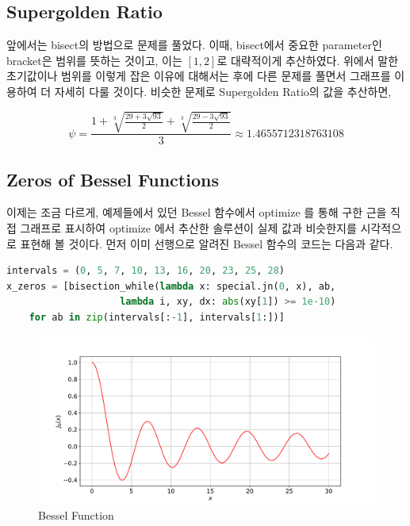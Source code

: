 \documentclass[11pt]{article}
\begin{document}
\vspace{5mm}

\vspace{5mm}

\subsection{Supergolden Ratio} 
\noindent
앞에서는 bisect의 방법으로 문제를 풀었다. 이때, bisect에서 중요한 parameter인 bracket은 범위를 뜻하는 것이고, 이는 $[1, 2]$로 대략적이게 추산하였다. 위에서 말한 초기값이나 범위를 이렇게 잡은 이유에 대해서는 후에 다른 문제를 풀면서 그래프를 이용하여 더 자세히 다룰 것이다. 비슷한 문제로 Supergolden Ratio의 값을 추산하면, 

\vspace{5mm}

\vspace{5mm}

$$
\psi = \frac{1 + \sqrt[3]{\frac{29 + 3\sqrt{93}}{2}} + \sqrt[3]{\frac{29 - 3\sqrt{93}}{2}}}{3}
\approx 1.4655712318763108
$$

\subsection{Zeros of Bessel Functions} 
\noindent
이제는 조금 다르게, 예제들에서 있던 Bessel 함수에서 optimize 를 통해 구한 근을 직접 그래프로 표시하여 optimize 에서 추산한 솔루션이 실제 값과 비슷한지를 시각적으로 표현해 볼 것이다. 먼저 이미 선행으로 알려진 Bessel 함수의 코드는 다음과 같다.

\begin{lstlisting}[language=Python]
intervals = (0, 5, 7, 10, 13, 16, 20, 23, 25, 28)
x_zeros = [bisection_while(lambda x: special.jn(0, x), ab,
                    lambda i, xy, dx: abs(xy[1]) >= 1e-10)
    for ab in zip(intervals[:-1], intervals[1:])]
\end{lstlisting}


\clearpage
\begin{figure}[!ht]
  \centering
  \includegraphics[width=1\textwidth]{Bessel_Functions.pdf}
  \caption{Bessel Function}
\end{figure}
\end{document}
